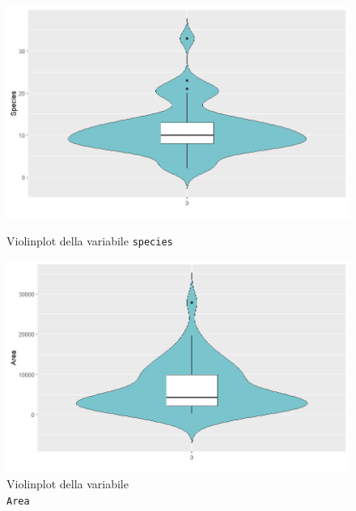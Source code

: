 \documentclass{article} %
\begin{document}

\begin{figure}[H]
    \centering
    \begin{minipage}{0.49\textwidth}
        \centering
        \includegraphics[width=\textwidth]{immagini/vp_species.png}
        \captionsetup{justification=centering}
        \caption{Violinplot della variabile \texttt{species}}
    \end{minipage}
    \hfill
    \begin{minipage}{0.49\textwidth}
        \centering
        \includegraphics[width=\textwidth]{immagini/vp_area.png}
        \captionsetup{justification=centering}
        \caption{Violinplot della variabile\\ \texttt{Area}}
    \end{minipage}
\end{figure}
\end{document}
